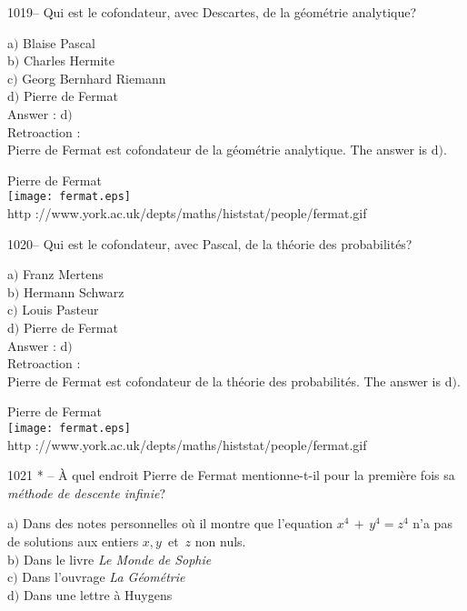 ﻿\documentclass[letterpaper, 12pt]{article}
\begin{document}
1019-- Qui est le cofondateur, avec Descartes, de la g\'eom\'etrie
analytique?

a$)$ Blaise Pascal \\
b$)$ Charles Hermite \\
c$)$ Georg Bernhard Riemann \\
d$)$ Pierre de Fermat\\

Answer : d$)$\\

Retroaction : \\
Pierre de Fermat est cofondateur de la g\'eom\'etrie analytique.
The answer is d$)$.\\

        \begin{center}
        Pierre de Fermat\\
    \texttt{[image: fermat.eps]}\\
        {\footnotesize http
://www.york.ac.uk/depts/maths/histstat/people/fermat.gif}
    \end{center}

1020-- Qui est le cofondateur, avec Pascal, de la th\'eorie des
probabilit\'es?

a$)$ Franz Mertens \\
b$)$ Hermann Schwarz \\
c$)$ Louis Pasteur \\
d$)$ Pierre de Fermat\\

Answer : d$)$\\

Retroaction : \\
Pierre de Fermat est cofondateur de la th\'eorie des probabilit\'es.
The answer is d$)$.\\

        \begin{center}
        Pierre de Fermat\\
    \texttt{[image: fermat.eps]}\\
        {\footnotesize http
://www.york.ac.uk/depts/maths/histstat/people/fermat.gif}
    \end{center}

1021 * -- \`A quel endroit Pierre de Fermat mentionne-t-il pour la
premi\`ere fois sa {\sl m\'ethode de descente infinie}?

a$)$ Dans des notes personnelles o\`u il montre que l'equation
$x^4\,+\,y^4=z^4$ n'a pas de solutions
aux entiers $x,y\,$ et $\,z$ non nuls. \\
b$)$ Dans le livre {\sl Le Monde de Sophie} \\
c$)$ Dans l'ouvrage {\sl La G\'eom\'etrie} \\
d$)$ Dans une lettre \`a Huygens\\
\end{document}
